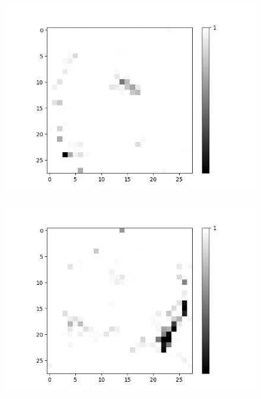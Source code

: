 \begin{figure}[H]
\begin{minipage}[b]{0.19\textwidth}
		\includegraphics[width=\textwidth]{OR-AND(OLD)(W-LSM)(1)/Layer0-Neuron-10.png}
		\label{}
	\end{minipage}
	\begin{minipage}[b]{0.19\textwidth}
		\includegraphics[width=\textwidth]{OR-AND(OLD)(W-LSM)(1)/Layer0-Neuron-14.png}
		\label{}
	\end{minipage}
		\begin{minipage}[b]{0.19\textwidth}

\end{minipage}
\end{figure}
